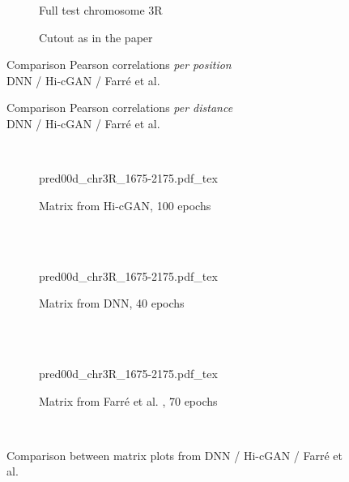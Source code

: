 \begin{figure}[htbp]
 \begin{subfigure}{0.45\textwidth}
  \caption{Full test chromosome 3R}
 \end{subfigure}\hfill
 \begin{subfigure}{0.45\textwidth}
  \caption{Cutout as in the paper \cite{Farre2018a}}
 \end{subfigure}
\caption{Comparison Pearson correlations \emph{per position}\\DNN / Hi-cGAN / Farr\'e et al. \cite{Farre2018a}}\label{fig:results:farre-vs-ours_pearson-pos_3R}
\end{figure}
\begin{figure}[htbp]
 \centering
 \caption{Comparison Pearson correlations \emph{per distance}\\DNN / Hi-cGAN / Farr\'e et al. \cite{Farre2018a}}\label{fig:results:farre-vs-ours_pearson-dist_3R}
\end{figure}

\begin{figure}[htbp]
\\
\begin{subfigure}{\textwidth}
 \centering
 \scriptsize
 {pred00d_chr3R_1675-2175.pdf_tex}
 \caption{Matrix from Hi-cGAN, 100 epochs} \label{fig:results:farre-vs-ours_cgan-matrix}
\end{subfigure}\\[5mm]
\\
\begin{subfigure}{\textwidth}
 \centering
 \scriptsize
 {pred00d_chr3R_1675-2175.pdf_tex}
 \caption{Matrix from DNN, 40 epochs} \label{fig:results:farre-vs-ours_dnn-matrix}
\end{subfigure}\\[5mm]
\\
\begin{subfigure}{\textwidth}
 \centering
 \scriptsize
 {pred00d_chr3R_1675-2175.pdf_tex}
 \caption{Matrix from Farr\'e et al. \cite{Farre2018a}, 70 epochs} \label{fig:results:farre-vs-ours_farre-matrix}
\end{subfigure}\\[5mm]
\caption{Comparison between matrix plots from DNN / Hi-cGAN / Farr\'e et al. \cite{Farre2018a}} \label{fig:results:farre-vs-ours_matrices}
\end{figure}

\clearpage
